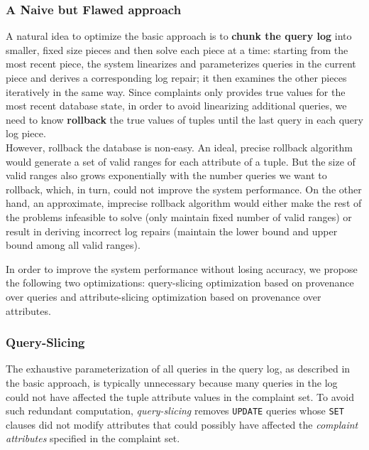 \subsubsection{A Naive but Flawed approach}
A natural idea to optimize the basic approach is 
to \textbf{chunk the query log} into
smaller, fixed size pieces and then solve each piece at a time: starting
from the most recent piece, the system linearizes and parameterizes queries 
in the current piece and derives a corresponding log repair; 
it then examines the other pieces iteratively
in the same way. Since complaints only provides
true values for the most recent database state, in order to avoid 
linearizing additional queries, 
we need to know \textbf{rollback} the true values of tuples 
until the last query in each query log piece. \\
However, rollback the database is non-easy. An ideal, precise rollback
algorithm would generate a set of valid ranges for each attribute of a tuple. 
But the size of valid ranges also grows exponentially with the number queries
we want to rollback, which, in turn, could not improve the system performance. 
On the other hand, an approximate, imprecise 
rollback algorithm would either make the rest of the problems
infeasible to solve (only maintain fixed number of valid ranges) 
or result in deriving 
incorrect log repairs (maintain the lower 
bound and upper bound among all valid ranges).
  

In order to improve the system performance without losing accuracy, we propose
the following two optimizations: query-slicing optimization 
based on provenance over queries and
attribute-slicing optimization based on provenance over 
attributes. 
\fi

\subsubsection{Query-Slicing}
\label{sec:opt:query}
The exhaustive parameterization of all queries in the query log, as described
in the basic approach, is typically unnecessary because many queries in the log
could not have affected the tuple attribute values in the complaint set.
To avoid such redundant computation, \textit{query-slicing} 
removes \texttt{UPDATE} queries whose \texttt{SET} clauses did not modify 
attributes that could possibly have affected the {\it complaint attributes} 
specified in the complaint set.

